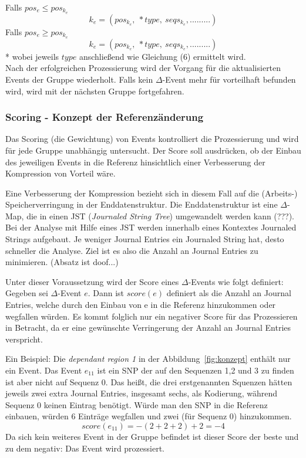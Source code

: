 \documentclass[12pt]{article}
\begin{document}
\noindent Falls $pos_{e} \le pos_{k_{e}}$
\begin{equation}
k_{e} = (pos_{k_{e}},~*type,~seqs_{k_{e}},.........)
\end{equation}
Falls $pos_{e} \ge pos_{k_{e}}$
\begin{equation}
k_{e} = (pos_{k_{e}},~*type,~seqs_{k_{e}},.........)
\end{equation}
* wobei jeweils $type$ anschließend wie Gleichung (6) ermittelt wird.\\

\noindent Nach der erfolgreichen Prozessierung wird der Vorgang für die aktualisierten Events der Gruppe wiederholt. Falls kein $\Delta$-Event mehr für vorteilhaft befunden wird, wird mit der nächsten Gruppe fortgefahren.
\subsubsection{Scoring - Konzept der Referenzänderung}
\label{sec:score}
Das Scoring (die Gewichtung) von Events kontrolliert die Prozessierung und wird für jede Gruppe unabhängig untersucht. Der Score soll ausdrücken, ob der Einbau des jeweiligen Events in die Referenz hinsichtlich einer Verbesserung der Kompression von Vorteil wäre.

Eine Verbesserung der Kompression bezieht sich in diesem Fall auf die (Arbeits-) Speicherverringung in der Enddatenstruktur. Die Enddatenstruktur ist eine $\Delta$-Map, die in einen JST (\textit{Journaled String Tree}) umgewandelt werden kann (???).  Bei der Analyse mit Hilfe eines JST werden innerhalb eines Kontextes Journaled Strings aufgebaut. Je weniger Journal Entries ein Journaled String hat, desto schneller die Analyse. Ziel ist es also die Anzahl an Journal Entries zu minimieren. (Absatz ist doof...)

Unter dieser Voraussetzung wird der Score eines $\Delta$-Events wie folgt definiert: Gegeben sei $\Delta$-Event $e$. Dann ist $score(e)$ definiert als  die Anzahl an Journal Entries, welche durch den Einbau von e in die Referenz hinzukommen oder wegfallen würden. Es kommt folglich nur ein negativer Score für das Prozessieren in Betracht, da er eine gewünschte Verringerung der Anzahl an Journal Entries verspricht.

Ein Beispiel: Die \textit{dependant region 1} in der Abbildung~\ref{fig:konzept} enthält nur ein Event. Das Event $e_{11}$ ist ein SNP der auf den Sequenzen 1,2 und 3 zu finden ist aber nicht auf Sequenz 0. Das heißt, die drei erstgenannten Squenzen hätten jeweils zwei extra Journal Entries, insgesamt sechs, als Kodierung, während Sequenz 0 keinen Eintrag benötigt. Würde man den SNP in die Referenz einbauen, würden 6 Einträge wegfallen und zwei (für Sequenz 0) hinzukommen.
\begin{equation}
score(e_{11}) = - (2 + 2 + 2) + 2 = - 4
\end{equation}
Da sich kein weiteres Event in der Gruppe befindet ist dieser Score der beste und zu dem negativ: Das Event wird prozessiert.
\end{document}
